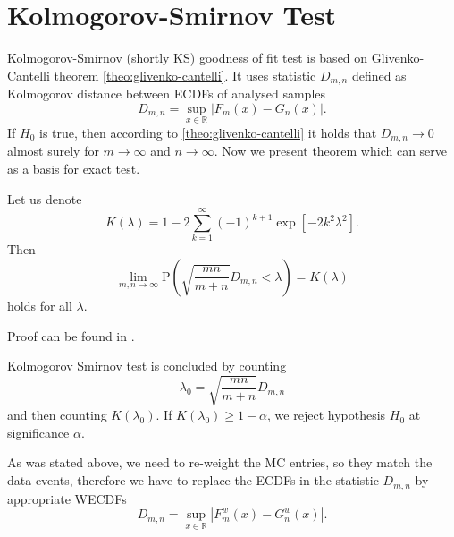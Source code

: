 \section{Kolmogorov-Smirnov Test}
Kolmogorov-Smirnov (shortly KS) goodness of fit test is based on Glivenko-Cantelli theorem \ref{theo:glivenko-cantelli}. It uses statistic $D_{m,n}$ defined as Kolmogorov distance between ECDFs of analysed samples
\begin{equation}
D_{m,n} = \sup_{x \in \mathbb{R}} |F_m(x) - G_n(x)|.
\end{equation}
If $H_0$ is true, then according to \ref{theo:glivenko-cantelli} it holds that $D_{m,n} \rightarrow 0$ almost surely for $m \rightarrow \infty$ and $n \rightarrow \infty$. Now we present theorem which can serve as a basis for exact test.

\begin{theorem}[Smirnov]
	Let us denote  
	\begin{equation}
	K(\lambda) = 1 - 2\sum_{k=1}^{\infty} (-1)^{k+1} \exp\left[ -2k^2\lambda^2\right].
	\end{equation}
	Then 
	\begin{equation}
	\lim_{m,n \rightarrow \infty} \mathrm{P}\left(\sqrt{\frac{mn}{m+n}}D_{m,n} < \lambda \right) = K(\lambda)
	\end{equation}
	holds for all $\lambda$.
\end{theorem}
\noindent Proof can be found in \cite{Smirnov1944}. 

\noindent Kolmogorov Smirnov test is concluded by counting 
\[\lambda_0 = \sqrt{\frac{mn}{m+n}}D_{m,n}\] and then counting $K\left( \lambda_0 \right)$. If $K\left( \lambda_0 \right) \geq 1 - \alpha$, we reject hypothesis $H_0$ at significance $\alpha$.

As was stated above, we need to re-weight the MC entries, so they match the data events, therefore we have to replace the ECDFs in the statistic $D_{m,n}$ by appropriate WECDFs
\begin{equation}
D_{m,n} = \sup_{x \in \mathbb{R}} |F^w_m(x) - G^w_n(x)|.
\end{equation}


